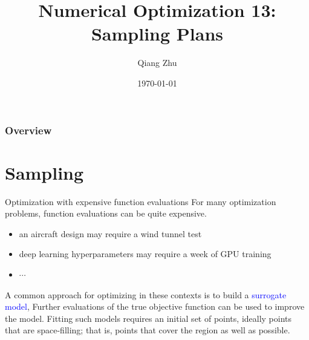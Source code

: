 \documentclass{beamer}
\title[Sampling Plans]{Numerical Optimization 13: Sampling Plans} %
\author{Qiang Zhu} %
\institute[University of Nevada Las Vegas] %
{
University of Nevada Las Vegas\\ %
\medskip
}
\date{\today} %
\begin{document}
\begin{frame}
\titlepage %
\end{frame}

\begin{frame}
\frametitle{Overview} %
\tableofcontents %
\end{frame}



\section{Sampling}
\begin{frame}{Optimization with expensive function evaluations }
For many optimization problems, function evaluations can be quite expensive. 
\begin{itemize}
    \item an aircraft design may require a wind tunnel test
    \item deep learning hyperparameters may require a week of GPU training
    \item $\cdots$
\end{itemize} 
A common approach for optimizing in these contexts is to build a \textcolor{blue}{surrogate model},
Further evaluations of the true objective function can be used to improve the model. Fitting such models requires an initial set of points, ideally points that are space-filling; that is, points that cover the region as well as possible. 
\end{frame}
\end{document}
